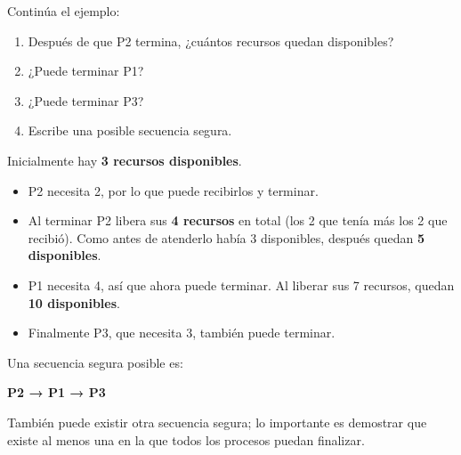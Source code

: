 \documentclass[
  spanish,
  letterpaper,
]{scrbook}
\providecommand{\tightlist}{%
  \setlength{\itemsep}{0pt}\setlength{\parskip}{0pt}}
\begin{document}
\begin{tcolorbox}[enhanced jigsaw, arc=.35mm, bottomrule=.15mm, bottomtitle=1mm, breakable, colback=white, colbacktitle=quarto-callout-note-color!10!white, colframe=quarto-callout-note-color-frame, coltitle=black, left=2mm, leftrule=.75mm, opacityback=0, opacitybacktitle=0.6, rightrule=.15mm, title=\textcolor{quarto-callout-note-color}{\faInfo}\hspace{0.5em}{Ejercicio guiado}, titlerule=0mm, toprule=.15mm, toptitle=1mm]

Continúa el ejemplo:

\begin{enumerate}
\def\labelenumi{\arabic{enumi}.}
\tightlist
\item
  Después de que P2 termina, ¿cuántos recursos quedan disponibles?
\item
  ¿Puede terminar P1?
\item
  ¿Puede terminar P3?
\item
  Escribe una posible secuencia segura.
\end{enumerate}

\end{tcolorbox}

\begin{tcolorbox}[enhanced jigsaw, arc=.35mm, bottomrule=.15mm, bottomtitle=1mm, breakable, colback=white, colbacktitle=quarto-callout-tip-color!10!white, colframe=quarto-callout-tip-color-frame, coltitle=black, left=2mm, leftrule=.75mm, opacityback=0, opacitybacktitle=0.6, rightrule=.15mm, title=\textcolor{quarto-callout-tip-color}{\faLightbulb}\hspace{0.5em}{✅ Ver solución}, titlerule=0mm, toprule=.15mm, toptitle=1mm]

Inicialmente hay \textbf{3 recursos disponibles}.

\begin{itemize}
\tightlist
\item
  P2 necesita 2, por lo que puede recibirlos y terminar.
\item
  Al terminar P2 libera sus \textbf{4 recursos} en total (los 2 que
  tenía más los 2 que recibió). Como antes de atenderlo había 3
  disponibles, después quedan \textbf{5 disponibles}.
\item
  P1 necesita 4, así que ahora puede terminar. Al liberar sus 7
  recursos, quedan \textbf{10 disponibles}.
\item
  Finalmente P3, que necesita 3, también puede terminar.
\end{itemize}

Una secuencia segura posible es:

\textbf{P2 → P1 → P3}

También puede existir otra secuencia segura; lo importante es demostrar
que existe al menos una en la que todos los procesos puedan finalizar.

\end{tcolorbox}
\end{document}
